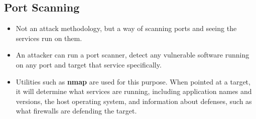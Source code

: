 \documentclass{article}
\theoremstyle{plain}
\theoremstyle{definition}
\begin{document}
\subsection{Port Scanning}
\begin{itemize}
    \item Not an attack methodology, but a way of scanning ports and seeing the services run on them. 
    
    \item An attacker can run a port scanner, detect any vulnerable software running on any port and target that service specifically. 
    
    \item Utilities such as \textbf{nmap} are used for this purpose. When pointed at a target, it will determine what services are running, including application names and versions, the host operating system, and information about defenses, such as what firewalls are defending the target. 
\end{itemize}
\end{document}
